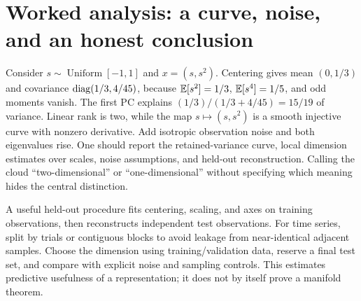\section{Worked analysis: a curve, noise, and an honest conclusion}
Consider $s\sim\operatorname{Uniform}[-1,1]$ and $x=(s,s^2)$. Centering gives mean $(0,1/3)$ and covariance $\operatorname{diag}(1/3,4/45)$, because $\mathbb{E}[s^2]=1/3$, $\mathbb{E}[s^4]=1/5$, and odd moments vanish. The first PC explains $(1/3)/(1/3+4/45)=15/19$ of variance. Linear rank is two, while the map $s\mapsto(s,s^2)$ is a smooth injective curve with nonzero derivative. Add isotropic observation noise and both eigenvalues rise. One should report the retained-variance curve, local dimension estimates over scales, noise assumptions, and held-out reconstruction. Calling the cloud ``two-dimensional'' or ``one-dimensional'' without specifying which meaning hides the central distinction.

A useful held-out procedure fits centering, scaling, and axes on training observations, then reconstructs independent test observations. For time series, split by trials or contiguous blocks to avoid leakage from near-identical adjacent samples. Choose the dimension using training/validation data, reserve a final test set, and compare with explicit noise and sampling controls. This estimates predictive usefulness of a representation; it does not by itself prove a manifold theorem.

